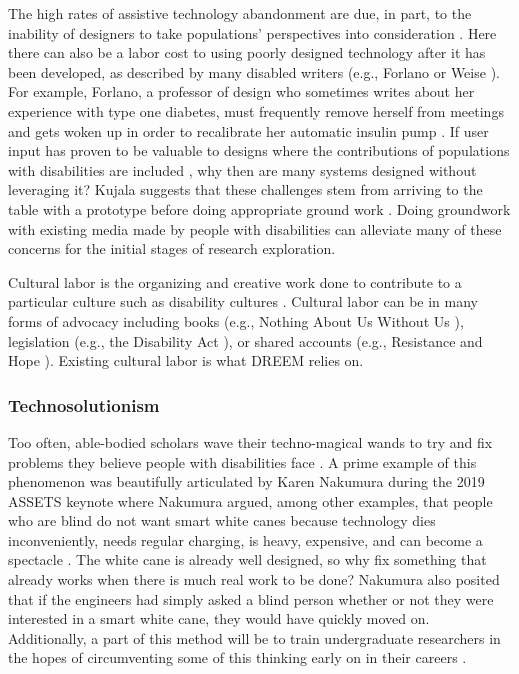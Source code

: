 The high rates of assistive technology abandonment are due, in part, to the inability of designers to take populations’ perspectives into consideration \cite{gitlinWHYOLDERPEOPLE1995,phillipsPredictorsAssistiveTechnology1993,vandijkEmpoweringPeopleImpairments2016}. Here there can also be a labor cost to using poorly designed technology after it has been developed, as described by many disabled writers (e.g., Forlano \cite{forlanoDangerIntimateAlgorithms2019} or Weise \cite{weiseCommonCyborg2018}). For example, Forlano, a professor of design who sometimes writes about her experience with type one diabetes, must frequently remove herself from meetings and gets woken up in order to recalibrate her automatic insulin pump \cite{forlanoDangerIntimateAlgorithms2019}. If user input has proven to be valuable to designs where the contributions of populations with disabilities are included \cite{karnaDesigningTechnologiesChildren2010,sampleBeginningsParticipatoryAction1996}, why then are many systems designed without leveraging it? Kujala suggests that these challenges stem from arriving to the table with a prototype before doing appropriate ground work \cite{kujalaUserInvolvementReview2003}. Doing groundwork with existing media made by people with disabilities can alleviate many of these concerns for the initial stages of research exploration.

Cultural labor is the organizing and creative work done to contribute to a particular culture such as disability cultures \cite{charltonNothingUsUs2000}. Cultural labor can be in many forms of advocacy including books (e.g., Nothing About Us Without Us \cite{charltonNothingUsUs2000}), legislation (e.g., the Disability Act \cite{civilrightsdivisionAmericansDisabilitiesAct}), or shared accounts (e.g., Resistance and Hope \cite{wongResistanceHopeEssays2018}).  Existing cultural labor is what DREEM relies on. 

\subsubsection{Technosolutionism} \label{Technosoultionism}
Too often, able-bodied scholars wave their techno-magical wands to try and fix problems they believe people with disabilities face \cite{morozovEverythingClickHere2013,charltonNothingUsUs2000}. A prime example of this phenomenon was beautifully articulated by Karen Nakumura during the 2019 ASSETS keynote where Nakumura argued, among other examples, that people who are blind do not want smart white canes because technology dies inconveniently, needs regular charging, is heavy, expensive, and can become a spectacle \cite{nakamuraMyAlgorithmsHave2019}. The white cane is already well designed, so why fix something that already works when there is much real work to be done? Nakumura also posited that if the engineers had simply asked a blind person whether or not they were interested in a smart white cane, they would have quickly moved on. Additionally, a part of this method will be to train undergraduate researchers in the hopes of circumventing some of this thinking early on in their careers \cite{shinoharaDesignSocialAccessibility2020}.


